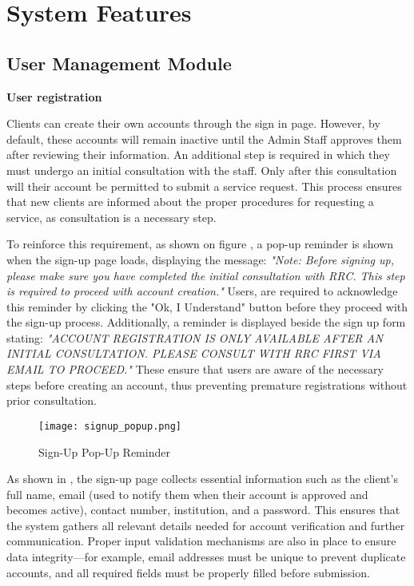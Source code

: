 \section{System Features}

\subsection{User Management Module}

\textbf{User registration}

Clients can create their own accounts through the sign in page. However, by default, these accounts will remain inactive until the Admin Staff approves them after reviewing their information. An additional step is required in which they must undergo an initial consultation with the staff. Only after this consultation will their account be permitted to submit a service request. This process ensures that new clients are informed about the proper procedures for requesting a service, as consultation is a necessary step.

To reinforce this requirement, as shown on figure , a pop-up reminder is shown when the sign-up page loads, displaying the message: 
\textit{"Note: Before signing up, please make sure you have completed the initial consultation with RRC. This step is required to proceed with account creation."}
Users, are required to acknowledge this reminder by clicking the "Ok, I Understand" button before they proceed with the sign-up process.
Additionally, a reminder is displayed beside the sign up form stating: 
\textit{"ACCOUNT REGISTRATION IS ONLY AVAILABLE AFTER AN INITIAL CONSULTATION. PLEASE CONSULT WITH RRC FIRST VIA EMAIL TO PROCEED."} 
These ensure that users are aware of the necessary steps before creating an account, thus preventing premature registrations without prior consultation.

\begin{figure}[h]
	\centering 
	\texttt{[image: signup\_popup.png]}
	\caption{Sign-Up Pop-Up Reminder}
	\label{fig:signup_popup}
\end{figure}

As shown in , the sign-up page collects essential information such as the client's full name, email (used to notify them when their account is approved and becomes active), contact number, institution, and a password. This ensures that the system gathers all relevant details needed for account verification and further communication. Proper input validation mechanisms are also in place to ensure data integrity—for example, email addresses must be unique to prevent duplicate accounts, and all required fields must be properly filled before submission.

